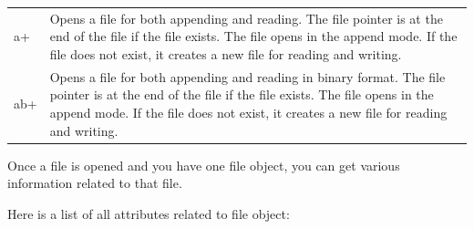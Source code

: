 \documentclass[11pt]{article}
\begin{document}
\begin{longtable}[]{@{}ll@{}}
\begin{minipage}[t]{0.03\columnwidth}\raggedright\strut
a+\strut
\end{minipage} & \begin{minipage}[t]{0.91\columnwidth}\raggedright\strut
Opens a file for both appending and reading. The file pointer is at the
end of the file if the file exists. The file opens in the append mode.
If the file does not exist, it creates a new file for reading and
writing.\strut
\end{minipage}\tabularnewline
\begin{minipage}[t]{0.03\columnwidth}\raggedright\strut
ab+\strut
\end{minipage} & \begin{minipage}[t]{0.91\columnwidth}\raggedright\strut
Opens a file for both appending and reading in binary format. The file
pointer is at the end of the file if the file exists. The file opens in
the append mode. If the file does not exist, it creates a new file for
reading and writing.\strut
\end{minipage}\tabularnewline
\bottomrule
\end{longtable}

Once a file is opened and you have one file object, you can get various
information related to that file.

Here is a list of all attributes related to file object:
\end{document}

